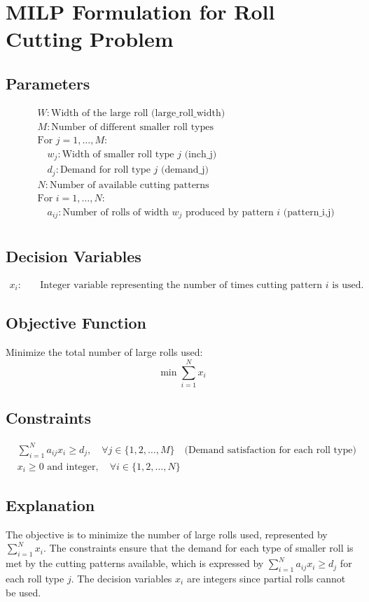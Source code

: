\documentclass{article}
\begin{document}
\section*{MILP Formulation for Roll Cutting Problem}

\subsection*{Parameters}
\begin{align*}
    & W: \text{Width of the large roll (large\_roll\_width)} \\
    & M: \text{Number of different smaller roll types} \\
    & \text{For } j = 1, \ldots, M: \\
    & \quad w_j: \text{Width of smaller roll type } j \text{ (inch\_j)} \\
    & \quad d_j: \text{Demand for roll type } j \text{ (demand\_j)} \\
    & N: \text{Number of available cutting patterns} \\
    & \text{For } i = 1, \ldots, N: \\
    & \quad a_{ij}: \text{Number of rolls of width } w_j \text{ produced by pattern } i \text{ (pattern\_{i,j})} \\
\end{align*}

\subsection*{Decision Variables}
\begin{align*}
    x_i: & \quad \text{Integer variable representing the number of times cutting pattern } i \text{ is used.}
\end{align*}

\subsection*{Objective Function}
Minimize the total number of large rolls used:
\[
\min \sum_{i=1}^{N} x_i
\]

\subsection*{Constraints}
\begin{align*}
    & \sum_{i=1}^{N} a_{ij} x_i \geq d_j, \quad \forall j \in \{1, 2, \ldots, M\} \quad \text{(Demand satisfaction for each roll type)} \\
    & x_i \geq 0 \text{ and integer}, \quad \forall i \in \{1, 2, \ldots, N\}
\end{align*}

\subsection*{Explanation}
The objective is to minimize the number of large rolls used, represented by $\sum_{i=1}^{N} x_i$. The constraints ensure that the demand for each type of smaller roll is met by the cutting patterns available, which is expressed by $\sum_{i=1}^{N} a_{ij} x_i \geq d_j$ for each roll type $j$. The decision variables $x_i$ are integers since partial rolls cannot be used.
\end{document}
